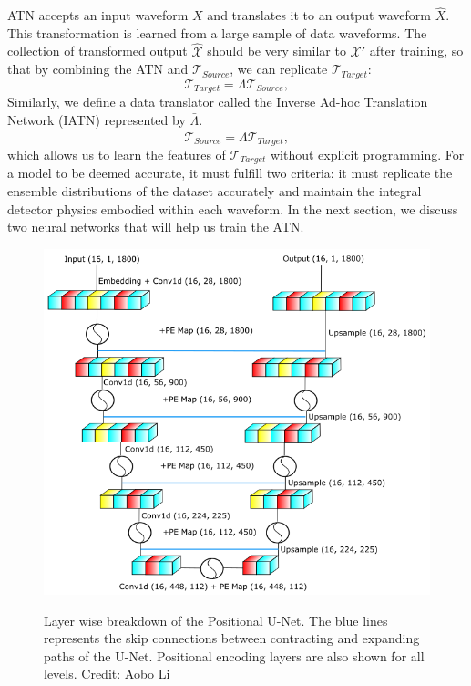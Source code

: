 ATN accepts an input waveform $X$ and translates it to an output waveform $\hat{X}$. This transformation is learned from a large sample of data waveforms. The collection of transformed output $\hat{\mathcal{X}}$ should be very similar to $\mathcal{X}'$ after training, so that by combining the ATN and $\mathcal{T}_{Source}$, we can replicate $\mathcal{T}_{Target}$:
\begin{equation}
    \mathcal{T}_{Target}=\Lambda \mathcal{T}_{Source} ,
    \label{eqn:ATN_task}
\end{equation}
Similarly, we define a data translator called the Inverse Ad-hoc Translation Network (IATN) represented by $\bar{\Lambda}$.
\begin{equation}
    \mathcal{T}_{Source}= \bar{\Lambda} \mathcal{T}_{Target} ,
    \label{eqn:IATN_task}
\end{equation}
which allows us to learn the features of $\mathcal{T}_{Target}$ without explicit programming. For a model to be deemed accurate, it must fulfill two criteria: it must replicate the ensemble distributions of the dataset accurately and maintain the integral detector physics embodied within each waveform. In the next section, we discuss two neural networks that will help us train the ATN.


\begin{figure}[htb!]
\centering
    \includegraphics[width=0.7\linewidth]{ch6/figs/unet.png}
    \label{fig:cpunet}
    \caption{Layer wise breakdown of the Positional U-Net. The blue lines represents the  skip connections between contracting and expanding paths of the U-Net. Positional encoding layers are also shown for all levels. Credit: Aobo Li}
   \label{fig:network_schematic}
\end{figure}

